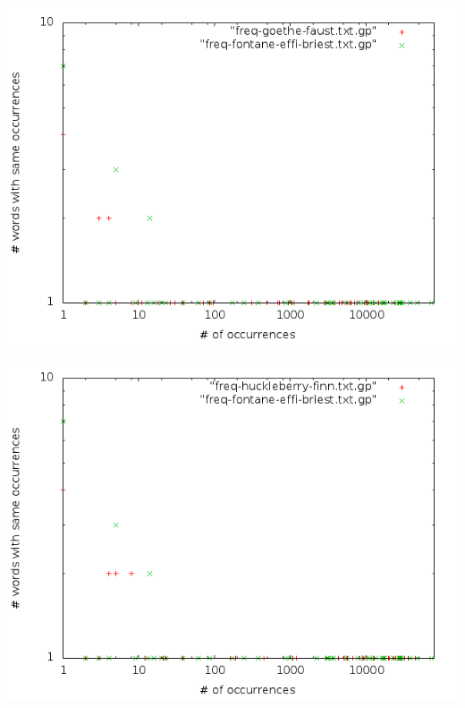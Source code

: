 \begin{frame}[c]
	\includegraphics[scale=0.4]{../task02-04/src/main/resources/results/task4/unigram/freq-de-de.png}
\end{frame}

\begin{frame}[c]
	\includegraphics[scale=0.4]{../task02-04/src/main/resources/results/task4/unigram/freq-de-en.png} 
\end{frame}

